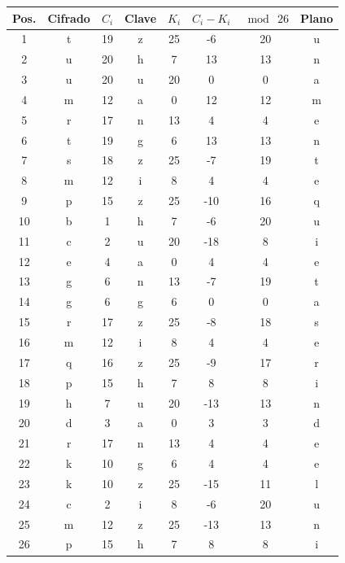 \begin{itemize}
        \begin{table}[H]
        \centering
        \begin{tabular}{|c|c|c|c|c|c|c|c|}
        \hline
        \textbf{Pos.} & \textbf{Cifrado} & $C_i$ & \textbf{Clave} & $K_i$ & $C_i - K_i$ & $\bmod\ 26$ & \textbf{Plano} \\
        \hline
        1  & t & 19 & z & 25 & -6  & 20 & u \\
        2  & u & 20 & h & 7  & 13  & 13 & n \\
        3  & u & 20 & u & 20 & 0   & 0  & a \\
        4  & m & 12 & a & 0  & 12  & 12 & m \\
        5  & r & 17 & n & 13 & 4   & 4  & e \\
        6  & t & 19 & g & 6  & 13  & 13 & n \\
        7  & s & 18 & z & 25 & -7  & 19 & t \\
        8  & m & 12 & i & 8  & 4   & 4  & e \\
        9  & p & 15 & z & 25 & -10 & 16 & q \\
        10 & b & 1  & h & 7  & -6  & 20 & u \\
        11 & c & 2  & u & 20 & -18 & 8  & i \\
        12 & e & 4  & a & 0  & 4   & 4  & e \\
        13 & g & 6  & n & 13 & -7  & 19 & t \\
        14 & g & 6  & g & 6  & 0   & 0  & a \\
        15 & r & 17 & z & 25 & -8  & 18 & s \\
        16 & m & 12 & i & 8  & 4   & 4  & e \\
        17 & q & 16 & z & 25 & -9  & 17 & r \\
        18 & p & 15 & h & 7  & 8   & 8  & i \\
        19 & h & 7  & u & 20 & -13 & 13 & n \\
        20 & d & 3  & a & 0  & 3   & 3  & d \\
        21 & r & 17 & n & 13 & 4   & 4  & e \\
        22 & k & 10 & g & 6  & 4   & 4  & e \\
        23 & k & 10 & z & 25 & -15 & 11 & l \\
        24 & c & 2  & i & 8  & -6  & 20 & u \\
        25 & m & 12 & z & 25 & -13 & 13 & n \\
        26 & p & 15 & h & 7  & 8   & 8  & i \\

\end{tabular}
\end{table}
\end{itemize}
